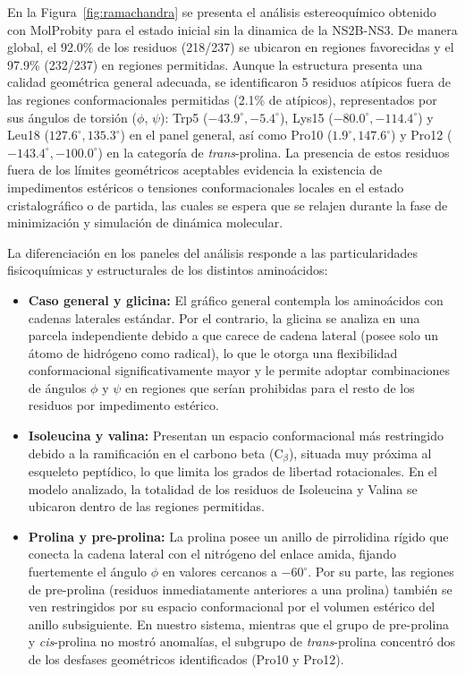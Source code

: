 En la Figura~\ref{fig:ramachandra} se presenta el análisis estereoquímico obtenido con MolProbity para el estado inicial sin la dinamica de la NS2B-NS3. De manera global, el 92.0\% de los residuos (218/237) se ubicaron en regiones favorecidas y el 97.9\% (232/237) en regiones permitidas. Aunque la estructura presenta una calidad geométrica general adecuada, se identificaron 5 residuos atípicos fuera de las regiones conformacionales permitidas (2.1\% de atípicos), representados por sus ángulos de torsión ($\phi$, $\psi$): Trp5 ($-43.9^\circ, -5.4^\circ$), Lys15 ($-80.0^\circ, -114.4^\circ$) y Leu18 ($127.6^\circ, 135.3^\circ$) en el panel general, así como Pro10 ($1.9^\circ, 147.6^\circ$) y Pro12 ($-143.4^\circ, -100.0^\circ$) en la categoría de \textit{trans}-prolina. La presencia de estos residuos fuera de los límites geométricos aceptables evidencia la existencia de impedimentos estéricos o tensiones conformacionales locales en el estado cristalográfico o de partida, las cuales se espera que se relajen durante la fase de minimización y simulación de dinámica molecular.

La diferenciación en los paneles del análisis responde a las particularidades fisicoquímicas y estructurales de los distintos aminoácidos:

\begin{itemize}
    \item \textbf{Caso general y glicina:} El gráfico general contempla los aminoácidos con cadenas laterales estándar. Por el contrario, la glicina se analiza en una parcela independiente debido a que carece de cadena lateral (posee solo un átomo de hidrógeno como radical), lo que le otorga una flexibilidad conformacional significativamente mayor y le permite adoptar combinaciones de ángulos $\phi$ y $\psi$ en regiones que serían prohibidas para el resto de los residuos por impedimento estérico.
    \item \textbf{Isoleucina y valina:} Presentan un espacio conformacional más restringido debido a la ramificación en el carbono beta ($\text{C}_\beta$), situada muy próxima al esqueleto peptídico, lo que limita los grados de libertad rotacionales. En el modelo analizado, la totalidad de los residuos de Isoleucina y Valina se ubicaron dentro de las regiones permitidas.
    \item \textbf{Prolina y pre-prolina:} La prolina posee un anillo de pirrolidina rígido que conecta la cadena lateral con el nitrógeno del enlace amida, fijando fuertemente el ángulo $\phi$ en valores cercanos a $-60^\circ$. Por su parte, las regiones de pre-prolina (residuos inmediatamente anteriores a una prolina) también se ven restringidos por su espacio conformacional por el volumen estérico del anillo subsiguiente. En nuestro sistema, mientras que el grupo de pre-prolina y \textit{cis}-prolina no mostró anomalías, el subgrupo de \textit{trans}-prolina concentró dos de los desfases geométricos identificados (Pro10 y Pro12).
\end{itemize}


